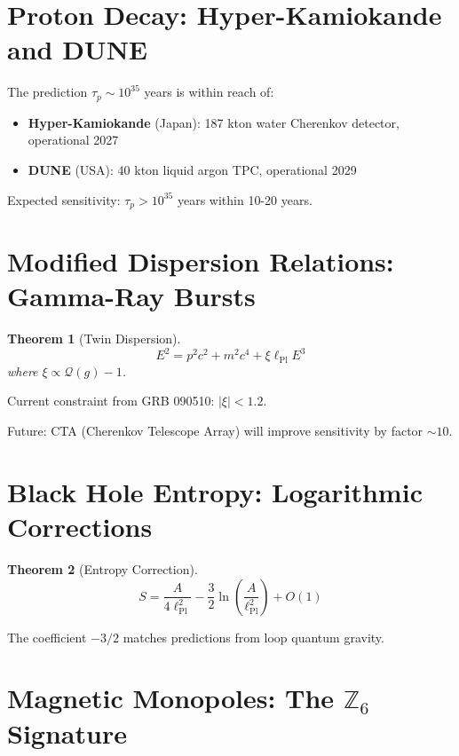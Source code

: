 \documentclass[11pt,a4paper,openright]{book}
\theoremstyle{plain}
\newtheorem{theorem}{Theorem}[chapter]
\theoremstyle{definition}
\newcommand{\Z}{\mathbb{Z}}
\newcommand{\ellPl}{\ell_{\mathrm{Pl}}}
\begin{document}
\section{Proton Decay: Hyper-Kamiokande and DUNE}

The prediction $\tau_p \sim 10^{35}$ years is within reach of:

\begin{itemize}
    \item \textbf{Hyper-Kamiokande} (Japan): 187 kton water Cherenkov detector, operational 2027
    \item \textbf{DUNE} (USA): 40 kton liquid argon TPC, operational 2029
\end{itemize}

Expected sensitivity: $\tau_p > 10^{35}$ years within 10-20 years.

\section{Modified Dispersion Relations: Gamma-Ray Bursts}

\begin{theorem}[Twin Dispersion]
\begin{equation}
E^2 = p^2c^2 + m^2c^4 + \xi\ellPl E^3
\end{equation}
where $\xi \propto \mathcal{Q}(g) - 1$.
\end{theorem}

Current constraint from GRB 090510: $|\xi| < 1.2$.

Future: CTA (Cherenkov Telescope Array) will improve sensitivity by factor $\sim 10$.

\section{Black Hole Entropy: Logarithmic Corrections}

\begin{theorem}[Entropy Correction]
\begin{equation}
S = \frac{A}{4\ellPl^2} - \frac{3}{2}\ln\left(\frac{A}{\ellPl^2}\right) + O(1)
\end{equation}
\end{theorem}

The coefficient $-3/2$ matches predictions from loop quantum gravity.

\section{Magnetic Monopoles: The $\Z_6$ Signature}
\end{document}
